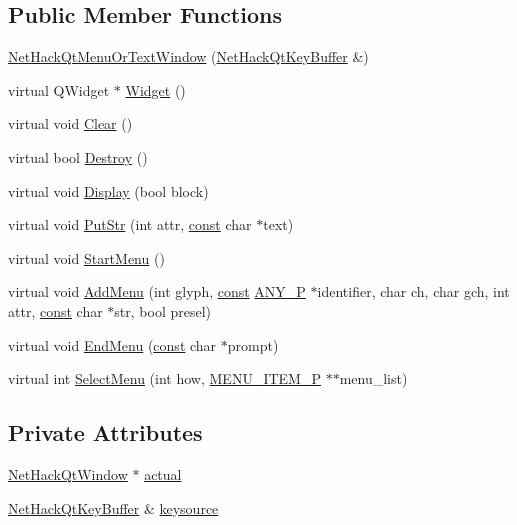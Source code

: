 \subsection*{Public Member Functions}
\begin{DoxyCompactItemize}
\item 
\hyperlink{classNetHackQtMenuOrTextWindow_ab138e45065e7bf17b15d90441776faea}{Net\+Hack\+Qt\+Menu\+Or\+Text\+Window} (\hyperlink{classNetHackQtKeyBuffer}{Net\+Hack\+Qt\+Key\+Buffer} \&)
\item 
virtual Q\+Widget $\ast$ \hyperlink{classNetHackQtMenuOrTextWindow_a97a7a47364d7399050d83a7248945904}{Widget} ()
\item 
virtual void \hyperlink{classNetHackQtMenuOrTextWindow_a905f497899ffba4bd30d0ebb35f39987}{Clear} ()
\item 
virtual bool \hyperlink{classNetHackQtMenuOrTextWindow_a33c2295892ed69866addd9e350cfcba9}{Destroy} ()
\item 
virtual void \hyperlink{classNetHackQtMenuOrTextWindow_aa987b7d3eb0c0d7908d630c30658764e}{Display} (bool block)
\item 
virtual void \hyperlink{classNetHackQtMenuOrTextWindow_a4ad92abd10b02cbf227a2e26de77d331}{Put\+Str} (int attr, \hyperlink{tradstdc_8h_a2c212835823e3c54a8ab6d95c652660e}{const} char $\ast$text)
\item 
virtual void \hyperlink{classNetHackQtMenuOrTextWindow_a7cc5fac3c80e4b0822e5feef6dea82e9}{Start\+Menu} ()
\item 
virtual void \hyperlink{classNetHackQtMenuOrTextWindow_a2004c50e7262775b4d38304107449de5}{Add\+Menu} (int glyph, \hyperlink{tradstdc_8h_a2c212835823e3c54a8ab6d95c652660e}{const} \hyperlink{wintype_8h_ae29f750de92b8a7c2566957e5863fbed}{A\+N\+Y\+\_\+\+P} $\ast$identifier, char ch, char gch, int attr, \hyperlink{tradstdc_8h_a2c212835823e3c54a8ab6d95c652660e}{const} char $\ast$str, bool presel)
\item 
virtual void \hyperlink{classNetHackQtMenuOrTextWindow_a781092285f3ee9ec66bdcb9ac4b81c3e}{End\+Menu} (\hyperlink{tradstdc_8h_a2c212835823e3c54a8ab6d95c652660e}{const} char $\ast$prompt)
\item 
virtual int \hyperlink{classNetHackQtMenuOrTextWindow_a3aa184755523e640eb13a09731f900da}{Select\+Menu} (int how, \hyperlink{wintype_8h_a56b56557611b7f64f4e6585a1b78c8f9}{M\+E\+N\+U\+\_\+\+I\+T\+E\+M\+\_\+\+P} $\ast$$\ast$menu\+\_\+list)
\end{DoxyCompactItemize}
\subsection*{Private Attributes}
\begin{DoxyCompactItemize}
\item 
\hyperlink{classNetHackQtWindow}{Net\+Hack\+Qt\+Window} $\ast$ \hyperlink{classNetHackQtMenuOrTextWindow_a2d0fb82699abff3a0ed4a8f338a0023e}{actual}
\item 
\hyperlink{classNetHackQtKeyBuffer}{Net\+Hack\+Qt\+Key\+Buffer} \& \hyperlink{classNetHackQtMenuOrTextWindow_a433fa3ee929fefa9f56638053eb8c83d}{keysource}
\end{DoxyCompactItemize}
